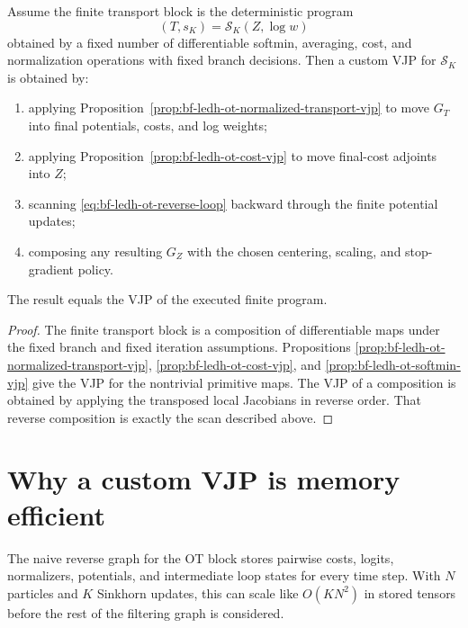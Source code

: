 \begin{proposition}
\label{prop:bf-ledh-ot-finite-sinkhorn-vjp}
Assume the finite transport block is the deterministic program
\[
  (T,s_K)=\mathcal S_K(Z,\log w)
\]
obtained by a fixed number of differentiable softmin, averaging, cost, and
normalization operations with fixed branch decisions.  Then a custom VJP for
\(\mathcal S_K\) is obtained by:
\begin{enumerate}[label=(\roman*)]
  \item applying Proposition~\ref{prop:bf-ledh-ot-normalized-transport-vjp} to
  move \(G_T\) into final potentials, costs, and log weights;
  \item applying Proposition~\ref{prop:bf-ledh-ot-cost-vjp} to move final-cost
  adjoints into \(Z\);
  \item scanning \eqref{eq:bf-ledh-ot-reverse-loop} backward through the finite
  potential updates;
  \item composing any resulting \(G_Z\) with the chosen centering, scaling, and
  stop-gradient policy.
\end{enumerate}
The result equals the VJP of the executed finite program.
\end{proposition}

\begin{proof}
The finite transport block is a composition of differentiable maps under the
fixed branch and fixed iteration assumptions.  Propositions
\ref{prop:bf-ledh-ot-normalized-transport-vjp},
\ref{prop:bf-ledh-ot-cost-vjp}, and
\ref{prop:bf-ledh-ot-softmin-vjp} give the VJP for the nontrivial primitive
maps.  The VJP of a composition is obtained by applying the transposed local
Jacobians in reverse order.  That reverse composition is exactly the scan
described above.
\end{proof}

\section{Why a custom VJP is memory efficient}
\label{sec:bf-ledh-ot-memory}

The naive reverse graph for the OT block stores pairwise costs, logits,
normalizers, potentials, and intermediate loop states for every time step.  With
\(N\) particles and \(K\) Sinkhorn updates, this can scale like \(O(KN^2)\) in
stored tensors before the rest of the filtering graph is considered.

